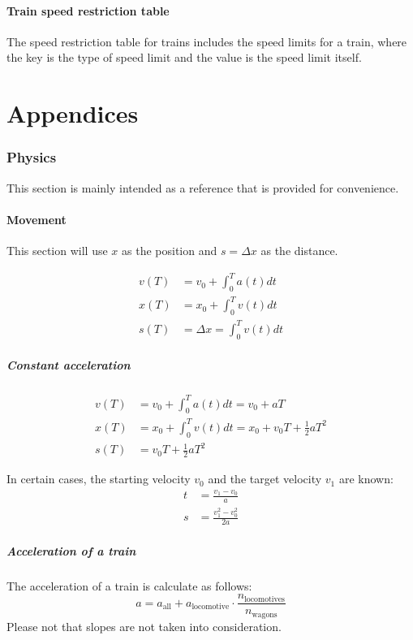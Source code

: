 \documentclass[notitlepage]{article}
\begin{document}
\subsection{Train speed restriction table}
The speed restriction table for trains includes the speed limits for a train, where the key is the type of speed limit and the value is the speed limit itself.

\appendix
\newpage
\part*{Appendices}

\section{Physics}\label{s:physics}
This section is mainly intended as a reference that is provided for convenience.

\subsection{Movement}

This section will use $x$ as the position and \( s = \Delta x \) as the distance.

\begin{align*}
  v(T) &= v_0 + \int_0^T a(t) dt \\
  x(T) &= x_0 + \int_0^T v(t) dt \\
  s(T) &= \Delta x = \int_0^T v(t) dt
\end{align*}

\subsubsection{Constant acceleration}
\begin{align*}
  v(T) &= v_0 + \int_0^T a(t)dt = v_0 + aT \\
  x(T) &= x_0 + \int_0^T v(t)dt = x_0 + v_0T + \frac{1}{2}aT^2 \\
  s(T) &= v_0T + \frac{1}{2}aT^2
\end{align*}

In certain cases, the starting velocity $v_0$ and the target velocity $v_1$ are known:
\begin{align*}
  t &= \frac{v_1 - v_0}{a} \\
  s &= \frac{v_1^2 - v_0^2}{2a}
\end{align*}

\subsubsection{Acceleration of a train}
The acceleration of a train is calculate as follows:
\[a = a_{\text{all}} + a_{\text{locomotive}}\cdot\frac{n_{\text{locomotives}}}{n_{\text{wagons}}}\]
Please not that slopes are not taken into consideration.
\end{document}
